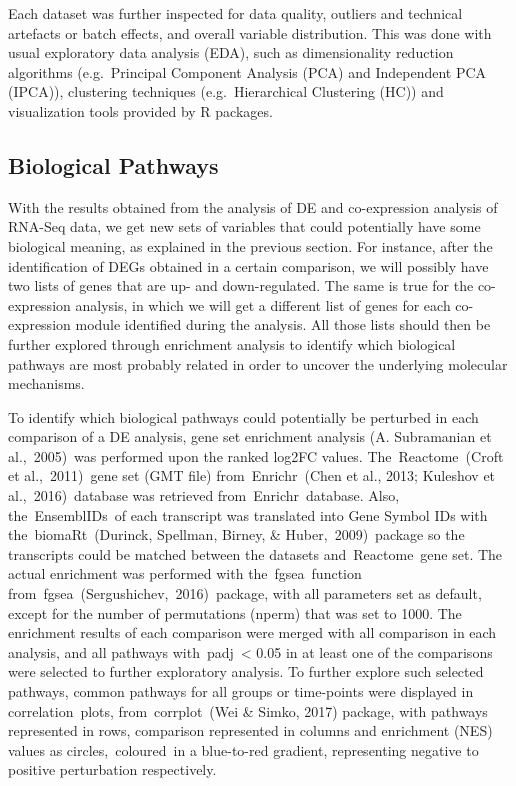 \documentclass[
]{book}
\begin{document}
Each dataset was further inspected for data quality, outliers and technical artefacts or batch effects, and overall variable distribution. This was done with usual exploratory data analysis (EDA), such as dimensionality reduction algorithms (e.g.~Principal Component Analysis (PCA) and Independent PCA (IPCA)), clustering techniques (e.g.~Hierarchical Clustering (HC)) and visualization tools provided by R packages.

\hypertarget{biological-pathways}{%
\subsection{Biological Pathways}\label{biological-pathways}}

With the results obtained from the analysis of DE and co-expression analysis of RNA-Seq data, we get new sets of variables that could potentially have some biological meaning, as explained in the previous section. For instance, after the identification of DEGs obtained in a certain comparison, we will possibly have two lists of genes that are up- and down-regulated. The same is true for the co-expression analysis, in which we will get a different list of genes for each co-expression module identified during the analysis. All those lists should then be further explored through enrichment analysis to identify which biological pathways are most probably related in order to uncover the underlying molecular mechanisms.

To identify which biological pathways could potentially be perturbed in each comparison of a DE analysis, gene set enrichment analysis (A. Subramanian et al.,~2005)⁠~was performed upon the ranked log2FC values. The~Reactome~(Croft et al.,~2011)⁠~gene set (GMT file) from~Enrichr~(Chen et al., 2013; Kuleshov et al.,~2016)⁠~database was retrieved from~Enrichr~database. Also, the~EnsemblIDs~of each transcript was translated into Gene Symbol IDs with the~biomaRt~(Durinck, Spellman, Birney, \& Huber,~2009)⁠~package so the transcripts could be matched between the datasets and~Reactome~gene set. The actual enrichment was performed with the~fgsea~function from~fgsea~(Sergushichev,~2016)⁠~package, with all parameters set as default, except for the number of permutations (nperm) that was set to 1000. The enrichment results of each comparison were merged with all comparison in each analysis, and all pathways with~padj~\textless{} 0.05 in at least one of the comparisons were selected to further exploratory analysis. To further explore such selected pathways, common pathways for all groups or time-points were displayed in correlation~plots, from~corrplot~(Wei \& Simko, 2017)⁠ package, with pathways represented in rows, comparison represented in columns and enrichment (NES) values as circles,~coloured~in a blue-to-red gradient, representing negative to positive perturbation respectively.
\end{document}
